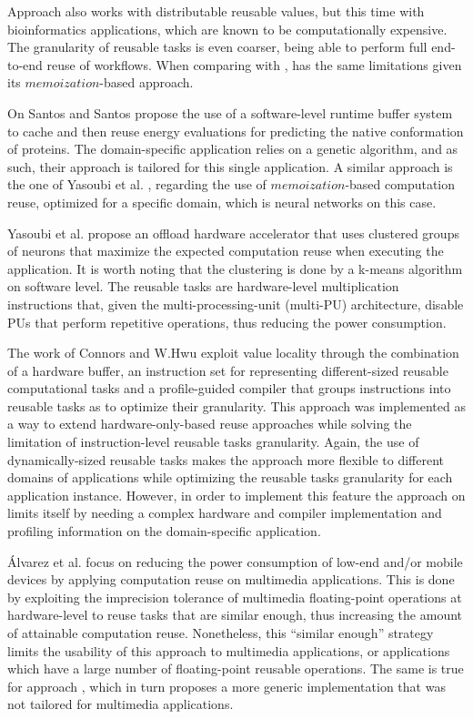 Approach \cite{reuse7} also works with distributable reusable values, but this time with  bioinformatics applications, which are known to be computationally expensive. The granularity of reusable tasks is even coarser, being able to perform full end-to-end reuse of workflows. When comparing with \cite{reuse5}, \cite{reuse7} has the same limitations given its $memoization$-based approach.

On \cite{reuse8} Santos and Santos propose the use of a software-level runtime buffer system to cache and then reuse energy evaluations for predicting the native conformation of proteins. The domain-specific application relies on a genetic algorithm, and as such, their approach is tailored for this single application. A similar approach is the one of Yasoubi et al. \cite{reuse9}, regarding the use of $memoization$-based computation reuse, optimized for a specific domain, which is neural networks on this case.

Yasoubi et al. \cite{reuse9} propose an offload hardware accelerator that uses clustered groups of neurons that maximize the expected computation reuse when executing the application. It is worth noting that the clustering is done by a k-means algorithm on software level. The reusable tasks are hardware-level multiplication instructions that, given the multi-processing-unit (multi-PU) architecture, disable PUs that perform repetitive operations, thus reducing the power consumption.

The work of Connors and W.Hwu \cite{reuse10} exploit value locality through the combination of a hardware buffer, an instruction set for representing different-sized reusable computational tasks and a profile-guided compiler that groups instructions into reusable tasks as to optimize their granularity. This approach was implemented as a way to extend hardware-only-based reuse approaches while solving the limitation of instruction-level reusable tasks granularity. Again, the use of dynamically-sized reusable tasks makes the approach more flexible to different domains of applications while optimizing the reusable tasks granularity for each application instance. However, in order to implement this feature the approach on \cite{reuse10} limits itself by needing a complex hardware and compiler implementation and profiling information on the domain-specific application.

Álvarez et al. \cite{reuse11} focus on reducing the power consumption of low-end and/or mobile devices by applying computation reuse on multimedia applications. This is done by exploiting the imprecision tolerance of multimedia floating-point operations at hardware-level to reuse tasks that are similar enough, thus increasing the amount of attainable computation reuse. Nonetheless, this ``similar enough'' strategy limits the usability of this approach to multimedia applications, or applications which have a large number of floating-point reusable operations. The same is true for approach \cite{reuse13}, which in turn proposes a more generic implementation that was not tailored for multimedia applications.

